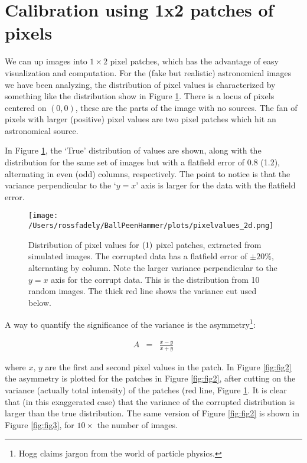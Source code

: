 \documentclass[12pt,preprint,pdftex]{aastex}
\begin{document}
\sloppy\sloppypar



\section{Calibration using 1x2 patches of pixels}

We can up images into $1\times2$ pixel patches, which has the advantage of easy 
visualization and computation.  For the (fake but realistic) astronomical images we 
have been analyzing, the distribution of pixel values is characterized by something 
like the distribution show in Figure \ref{fig:fig1}.  There is a locus of pixels centered on 
$(0,0)$, these are the parts of the image with no sources.  The fan of pixels with larger 
(positive) pixel values are two pixel patches which hit an astronomical source.  

In Figure \ref{fig:fig1}, the `True' distribution of values are shown, along with the distribution 
for the same set of images but with a flatfield error of 0.8 (1.2), alternating in even (odd) 
columns, respectively.  The point to notice is that the variance perpendicular to the `$y=x$' 
axis is larger for the data with the flatfield error.

\begin{figure}
\centering
 \texttt{[image: /Users/rossfadely/BallPeenHammer/plots/pixelvalues\_2d.png]}
\caption{Distribution of pixel values for $(1\time2)$ pixel patches, extracted from simulated images.  The corrupted data has a flatfield error of $\pm20\%$, alternating by column.  Note the larger variance perpendicular to the $y=x$ axis for the corrupt data. This is the distribution from 10 random images.  The thick red line shows the variance cut used below.}
\label{fig:fig1}
\end{figure}

A way to quantify the significance of the variance is the asymmetry\footnote{Hogg claims jargon from the world of particle physics.}:

\begin{eqnarray}
A &=& \frac{x-y}{x+y}
\end{eqnarray}

\noindent where $x, \,y$ are the first and second pixel values in the patch.  In Figure \ref{fig:fig2} the asymmetry is plotted for the patches in Figure \ref{fig:fig2}, after cutting on the variance (actually total intensity) of the patches (red line, Figure \ref{fig:fig1}.  It is clear that (in this exaggerated case) that the variance of the corrupted distribution is larger than the true distribution.  The same version of Figure \ref{fig:fig2} is shown in Figure \ref{fig:fig3}, for $10\times$ the number of images.
\end{document}
